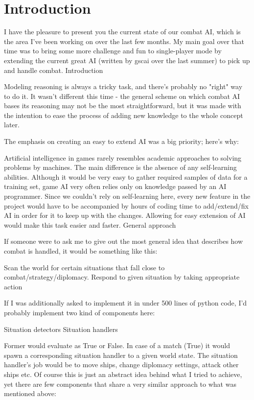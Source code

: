 \chapter{Introduction}

I have the pleasure to present you the current state of our combat AI, which is the area I've been working on over the last few months. 
My main goal over that time was to bring some more challenge and fun to single-player mode by extending the current great AI (written by gscai over the last summer) to pick up and handle combat.
Introduction

Modeling reasoning is always a tricky task, and there's probably no "right" way to do it. 
It wasn't different this time - the general scheme on which combat AI bases its reasoning may not be the most straightforward, but it was made with the intention to ease the process of adding new knowledge to the whole concept later.

The emphasis on creating an easy to extend AI was a big priority; here's why:

Artificial intelligence in games rarely resembles academic approaches to solving problems by machines. 
The main difference is the absence of any self-learning abilities. 
Although it would be very easy to gather required samples of data for a training set, game AI very often relies only on knowledge passed by an AI programmer. 
Since we couldn't rely on self-learning here, every new feature in the project would have to be accompanied by hours of coding time to add/extend/fix AI in order for it to keep up with the changes. 
Allowing for easy extension of AI would make this task easier and faster.
General approach

If someone were to ask me to give out the most general idea that describes how combat is handled, it would be something like this:

    Scan the world for certain situations that fall close to combat/strategy/diplomacy.
    Respond to given situation by taking appropriate action

If I was additionally asked to implement it in under 500 lines of python code, I'd probably implement two kind of components here:

    Situation detectors
    Situation handlers

Former would evaluate as True or False. 
In case of a match (True) it would spawn a corresponding situation handler to a given world state. 
The situation handler's job would be to move ships, change diplomacy settings, attack other ships etc. 
Of course this is just an abstract idea behind what I tried to achieve, yet there are few components that share a very similar approach to what was mentioned above:


